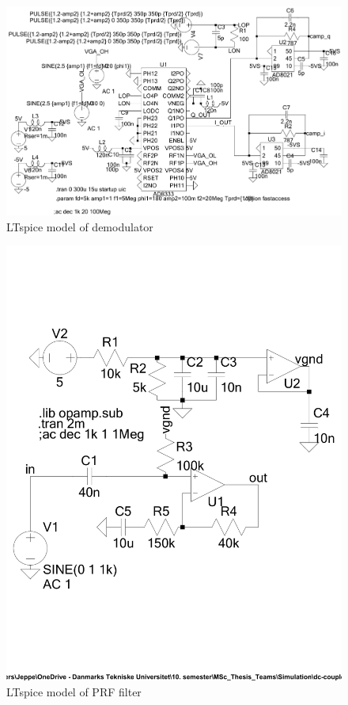 \begin{figure}[htbp]
	\centering
	\includegraphics[width=.9\textwidth]{Figures/appendix/ltspice_demod.pdf}
	\caption{LTspice model of demodulator}
	\label{fig:app_ltspice_demod}
\end{figure}
\begin{figure}[htbp]
	\centering
	\includegraphics[width=.9\textwidth]{Figures/appendix/ltspice_dccoupler.pdf}
	\caption{LTspice model of PRF filter}
	\label{fig:app_ltspice_dc_coupler}
\end{figure}


